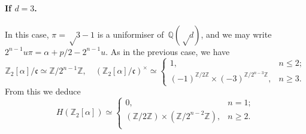 \documentclass{article}
\let\fr\mathfrak
\begin{document}
\paragraph{If $d = 3$.} In this case, $π = √{3}-1$ is a uniformiser
of~$ℚ(√{d})$, and we may write~$2^{n-1} u π = α + p/2 - 2^{n-1} u$. As in
the previous case, we have
\begin{equation}
ℤ_2[α]/\fr c ≃ ℤ/2^{n-1} ℤ, \quad
(ℤ_2[α]/\fr c)^{×} ≃ \begin{cases} 1,&n ≤ 2;\\
(-1)^{ℤ/2ℤ} × (-3)^{ℤ/2^{n-3} ℤ},&n ≥ 3.\end{cases}
\end{equation}
From this we deduce
\begin{equation}
H(ℤ_2[α]) ≃ \begin{cases} 0, & n = 1;\\
(ℤ/2ℤ) × (ℤ/2^{n-2}ℤ),& n ≥ 2.\\\end{cases}
\end{equation}
\end{document}
